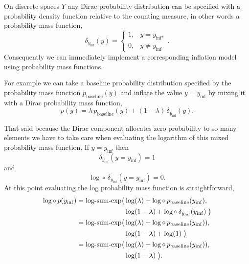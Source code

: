 \documentclass[
  letterpaper,
  DIV=11,
  numbers=noendperiod]{scrartcl}
\begin{document}
On discrete spaces \(Y\) any Dirac probability distribution can be
specified with a probability density function relative to the counting
measure, in other words a probability mass function, \[
\delta_{y_{\mathrm{inf}}}(y)
=
\left\{
\begin{array}{rl}
1, & y =   y_{\mathrm{inf}}, \\
0, & y \ne y_{\mathrm{inf}}
\end{array}
\right. .
\] Consequently we can immediately implement a corresponding inflation
model using probability mass functions.

For example we can take a baseline probability distribution specified by
the probability mass function \(p_{\mathrm{baseline}}(y)\) and inflate
the value \(y = y_{\mathrm{inf}}\) by mixing it with a Dirac probability
mass function, \[
p(y) =
  \lambda \, p_{\mathrm{baseline}}(y)
+ (1 - \lambda) \, \delta_{y_{\mathrm{inf}}}(y).
\]

That said because the Dirac component allocates zero probability to so
many elements we have to take care when evaluating the logarithm of this
mixed probability mass function. If \(y = y_{\mathrm{inf}}\) then \[
\delta_{y_{\mathrm{inf}}}(y = y_{\mathrm{inf}}) = 1
\] and \[
\log \circ \, \delta_{y_{\mathrm{inf}}}(y = y_{\mathrm{inf}}) = 0.
\] At this point evaluating the log probability mass function is
straightforward, \begin{align*}
\log \circ \, p(y_{\mathrm{inf}})
&=
\text{log-sum-exp}\big(
  \log(\lambda)
+ \log \circ \, p_{\mathrm{baseline}}(y_{\mathrm{inf}}),
\\
&
\hphantom{=\text{log-sum-exp}\big(\;}
  \log(1 - \lambda)
+ \log \circ \, \delta_{y_{\mathrm{inf}}}(y_{\mathrm{inf}}) \; \big)
\\
&=
\text{log-sum-exp}\big(
  \log(\lambda)
+ \log \circ \, p_{\mathrm{baseline}}(y_{\mathrm{inf}}) ),
\\
&
\hphantom{=\text{log-sum-exp}\big(\;}
 \log(1 - \lambda)  + \log(1) \; \big)
\\
&=
\text{log-sum-exp}\big(
  \log(\lambda)
+ \log \circ \, p_{\mathrm{baseline}}(y_{\mathrm{inf}}) ),
\\
&
\hphantom{=\text{log-sum-exp}\big(\;}
\log(1 - \lambda) \; \big).
\end{align*}
\end{document}
